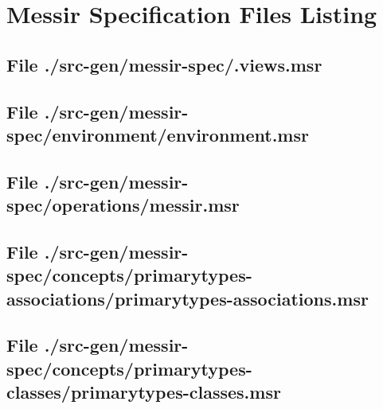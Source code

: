 \chapter{Messir Specification Files Listing}

\section[File /src-gen/messir-spec/.views.msr]{File ./src-gen/messir-spec/.views.msr}
\scriptsize

\normalsize
	
\section[File /src-gen/messir-spec/environment/environment.msr]{File ./src-gen/messir-spec/environment/environment.msr}
\scriptsize

\normalsize
	
\section[File /src-gen/messir-spec/operations/messir.msr]{File ./src-gen/messir-spec/operations/messir.msr}
\scriptsize

\normalsize
	
\section[File /src-gen/messir-spec/concepts.../primarytypes-associations.msr]{File ./src-gen/messir-spec/concepts/primarytypes-associations/primarytypes-associations.msr}
\scriptsize

\normalsize
	
\section[File /src-gen/messir-spec/concepts/primarytypes-classes/primarytypes-classes.msr]{File ./src-gen/messir-spec/concepts/primarytypes-classes/primarytypes-classes.msr}
\scriptsize

\normalsize
	
